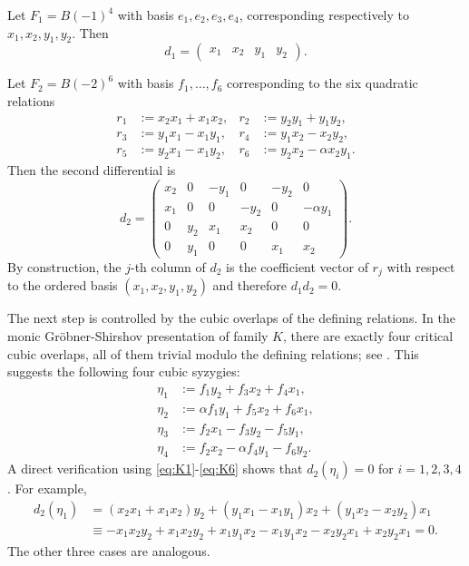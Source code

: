 \documentclass[reqno]{amsart}
\numberwithin{equation}{section}
\theoremstyle{definition}
\begin{document}
Let \(F_1=B(-1)^4\) with basis \(e_1,e_2,e_3,e_4\), corresponding respectively to \(x_1,x_2,y_1,y_2\). Then
\begin{equation}\label{eq:d1}
d_1=
\begin{pmatrix}
x_1 & x_2 & y_1 & y_2
\end{pmatrix}.
\end{equation}

Let \(F_2=B(-2)^6\) with basis \(f_1,\dots,f_6\) corresponding to the six quadratic relations
\begin{align*}
r_1&:=x_2x_1+x_1x_2, &
r_2&:=y_2y_1+y_1y_2,\\
r_3&:=y_1x_1-x_1y_1, &
r_4&:=y_1x_2-x_2y_2,\\
r_5&:=y_2x_1-x_1y_2, &
r_6&:=y_2x_2-\alpha x_2y_1.
\end{align*}
Then the second differential is
\begin{equation}\label{eq:d2}
d_2=
\begin{pmatrix}
x_2 & 0   & -y_1 & 0      & -y_2 & 0 \\
x_1 & 0   & 0    & -y_2   & 0    & -\alpha y_1 \\
0   & y_2 & x_1  & x_2    & 0    & 0 \\
0   & y_1 & 0    & 0      & x_1  & x_2
\end{pmatrix}.
\end{equation}
By construction, the \(j\)-th column of \(d_2\) is the coefficient vector of \(r_j\) with respect to the ordered basis \((x_1,x_2,y_1,y_2)\) and therefore \(d_1d_2=0\).

The next step is controlled by the cubic overlaps of the defining relations. In the monic Gr\"obner-Shirshov presentation of family \(K\), there are exactly four critical cubic overlaps, all of them trivial modulo the defining relations; see \cite[Section~4.6]{HHR25}. This suggests the following four cubic syzygies:
\begin{align}
\eta_1&:=f_1y_2+f_3x_2+f_4x_1,\label{eq:eta1}\\
\eta_2&:=\alpha f_1y_1+f_5x_2+f_6x_1,\label{eq:eta2}\\
\eta_3&:=f_2x_1-f_3y_2-f_5y_1,\label{eq:eta3}\\
\eta_4&:=f_2x_2-\alpha f_4y_1-f_6y_2.\label{eq:eta4}
\end{align}
A direct verification using \eqref{eq:K1}-\eqref{eq:K6} shows that \(d_2(\eta_i)=0\) for \(i=1,2,3,4\). For example,
\begin{align*}
d_2(\eta_1)
&=(x_2x_1+x_1x_2)y_2+(y_1x_1-x_1y_1)x_2+(y_1x_2-x_2y_2)x_1\\
&\equiv -x_1x_2y_2+x_1x_2y_2+x_1y_1x_2-x_1y_1x_2-x_2y_2x_1+x_2y_2x_1=0.
\end{align*}
The other three cases are analogous.
\end{document}
